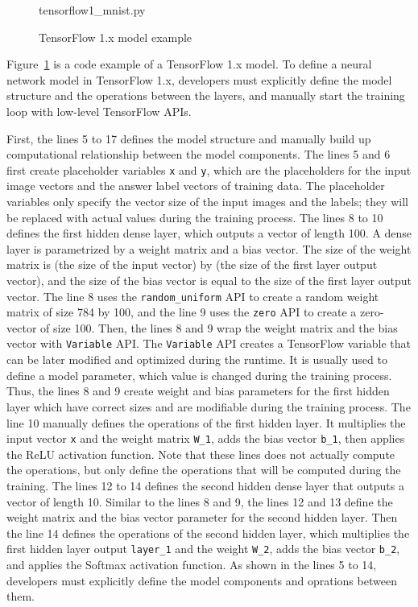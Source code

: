 \begin{figure}[ht!]

{tensorflow1_mnist.py}
  \caption{TensorFlow 1.x model example}
\label{fig:back:tf1}
\end{figure}

Figure~\ref{fig:back:tf1} is a code example of a TensorFlow 1.x model.
To define a neural network model in TensorFlow 1.x, 
developers must explicitly define the model structure
and the operations between the layers, 
and manually start the training loop with low-level TensorFlow APIs.

First, the lines 5 to 17 defines the model structure and manually build up
computational relationship between the model components.
The lines 5 and 6 first create placeholder variables {\tt x} and {\tt y},
which are the placeholders for the input image vectors 
and the answer label vectors of training data.
The placeholder variables only specify the vector size of the input images
and the labels; they will be replaced with actual values during the training
process. 
The lines 8 to 10 defines the first hidden dense layer, which outputs a
vector of length 100.
A dense layer is parametrized by a weight matrix and a bias vector.
The size of the weight matrix is (the size of the input vector) by 
(the size of the first layer output vector), and the size of the bias vector
is equal to the size of the first layer output vector.
The line 8 uses the {\tt random\_uniform} API to create 
a random weight matrix of size 784 by 100, 
and the line 9 uses the {\tt zero} API to create a zero-vector of size 100.
Then, the lines 8 and 9 wrap the weight matrix and the bias vector with
{\tt Variable} API.
The {\tt Variable} API creates a TensorFlow variable that can be later modified
and optimized during the runtime.
It is usually used to define a model parameter, 
which value is changed during the training process.
Thus, the lines 8 and 9 create weight and bias parameters for the first
hidden layer which have correct sizes and are modifiable during the 
training process.
The line 10 manually defines the operations of the first hidden layer. 
It multiplies the input vector {\tt x} and the weight matrix 
{\tt W\_1}, adds the bias vector {\tt b\_1}, then applies the ReLU activation
function.
Note that these lines does not actually compute the operations,
but only define the operations that will be computed during the training.
The lines 12 to 14 defines the second hidden dense layer that outputs a
vector of length 10.
Similar to the lines 8 and 9, the lines 12 and 13 define the weight matrix
and the bias vector parameter for the second hidden layer.
Then the line 14 defines the operations of the second hidden layer,
which multiplies the first hidden layer output {\tt layer\_1} and
the weight {\tt W\_2}, adds the bias vector {\tt b\_2}, and applies the
Softmax activation function.
As shown in the lines 5 to 14, developers must explicitly define
the model components and oprations between them.

